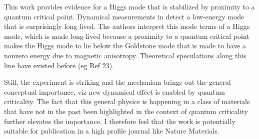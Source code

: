 This work provides evidence for a Higgs mode that is stabilized by proximity to a quantum critical point. Dynamical measurements in  detect a low-energy mode that is surprisingly long lived. The authors interpret this mode terms of a Higgs mode, which is made long-lived because a proximity to a quantum critical point makes the Higgs mode to lie below the Goldstone mode that is made to have a nonzero energy due to magnetic anisotropy. Theoretical speculations along this line have existed before (eg Ref 23).

Still, the experiment is striking and the mechanism brings out the general conceptual importance, viz new dynamical effect is enabled by quantum criticality. The fact that this general physics is happening in a class of materials that have not in the past been highlighted in the context of quantum criticality further elevates the importance. I therefore feel that the work is potentially suitable for publication in a high profile journal like Nature Materials.
